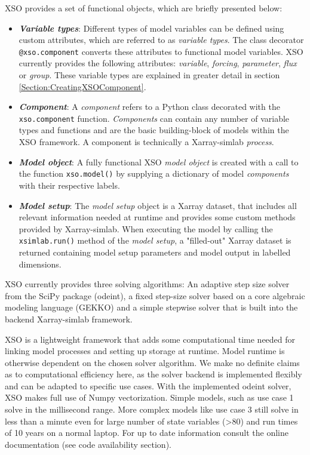 \documentclass[journal abbreviation, manuscript]{copernicus}
\begin{document}
XSO provides a set of functional objects, which are briefly presented below:
\begin{itemize}
    \item \textbf{\textit{Variable types}}: 
    Different types of model variables can be defined using custom attributes, which are referred to as \textit{variable types}. The class decorator \texttt{@xso.component} converts these attributes to functional model variables. XSO currently provides the following attributes: \textit{variable}, \textit{forcing}, \textit{parameter}, \textit{flux} or \textit{group}. These variable types are explained in greater detail in section \ref{Section:CreatingXSOComponent}.
    
    \item \textbf{\textit{Component}}: 
    A \textit{component} refers to a Python class decorated with the \texttt{xso.component} function. \textit{Components} can contain any number of variable types and functions and are the basic building-block of models within the XSO framework. A component is technically a Xarray-simlab \textit{process}.
    
    \item \textbf{\textit{Model object}}: 
    A fully functional XSO \textit{model object} is created with a call to the function \texttt{xso.model()} by supplying a dictionary of model \textit{components} with their respective labels.
    
    \item \textbf{\textit{Model setup}}:
    The \textit{model setup} object is a Xarray dataset, that includes all relevant information needed at runtime and provides some custom methods provided by Xarray-simlab.
    When executing the model by calling the \texttt{xsimlab.run()} method of the \textit{model setup}, a "filled-out" Xarray dataset is returned containing model setup parameters and model output in labelled dimensions.

\end{itemize}

XSO currently provides three solving algorithms: An adaptive step size solver from the SciPy package (odeint), a fixed step-size solver based on a core algebraic modeling language (GEKKO) and a simple stepwise solver that is built into the backend Xarray-simlab framework.

XSO is a lightweight framework that adds some computational time needed for linking model processes and setting up storage at runtime. Model runtime is otherwise dependent on the chosen solver algorithm. We make no definite claims as to computational efficiency here, as the solver backend is implemented flexibly and can be adapted to specific use cases. With the implemented odeint solver, XSO makes full use of Numpy vectorization. Simple models, such as use case 1 solve in the millisecond range. More complex models like use case 3 still solve in less than a minute even for large number of state variables (>80) and run times of 10 years on a normal laptop.
For up to date information consult the online documentation (see code availability section).
\end{document}
